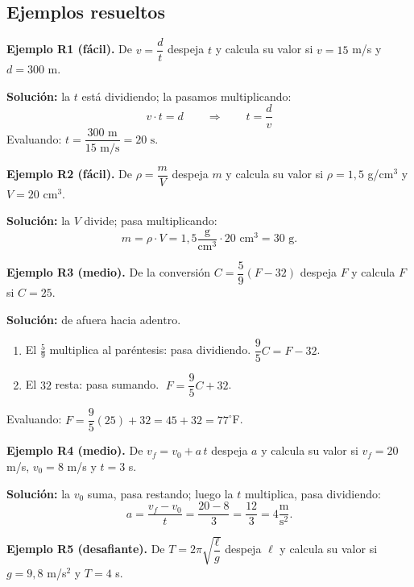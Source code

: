 \documentclass[12pt, letterpaper]{article}
\begin{document}
\subsection{Ejemplos resueltos}

\textbf{Ejemplo R1 (fácil).} De $v = \dfrac{d}{t}$ despeja $t$ y calcula su valor si $v = 15$ m/s y $d = 300$ m.

\begin{cuadrosolucion}
  \textbf{Solución:} la $t$ está dividiendo; la pasamos multiplicando:
  $$v \cdot t = d \qquad \Longrightarrow \qquad t = \frac{d}{v}$$
  Evaluando: $t = \dfrac{300 \text{ m}}{15 \text{ m/s}} = 20 \text{ s}$.
\end{cuadrosolucion}

\textbf{Ejemplo R2 (fácil).} De $\rho = \dfrac{m}{V}$ despeja $m$ y calcula su valor si $\rho = 1{,}5$ g/cm$^3$ y $V = 20$ cm$^3$.

\begin{cuadrosolucion}
  \textbf{Solución:} la $V$ divide; pasa multiplicando:
  $$m = \rho \cdot V = 1{,}5 \frac{\text{g}}{\text{cm}^3} \cdot 20 \text{ cm}^3 = 30 \text{ g}.$$
\end{cuadrosolucion}

\textbf{Ejemplo R3 (medio).} De la conversión $C = \dfrac{5}{9}(F - 32)$ despeja $F$ y calcula $F$ si $C = 25$.

\begin{cuadrosolucion}
  \textbf{Solución:} de afuera hacia adentro.
  \begin{enumerate}[leftmargin=*, label=\arabic*.]
    \item El $\frac{5}{9}$ multiplica al paréntesis: pasa dividiendo. $\dfrac{9}{5}C = F - 32$.
    \item El $32$ resta: pasa sumando. $\;F = \dfrac{9}{5}C + 32$.
  \end{enumerate}
  Evaluando: $F = \dfrac{9}{5}(25) + 32 = 45 + 32 = 77^{\circ}$F.
\end{cuadrosolucion}

\textbf{Ejemplo R4 (medio).} De $v_f = v_0 + a\,t$ despeja $a$ y calcula su valor si $v_f = 20$ m/s, $v_0 = 8$ m/s y $t = 3$ s.

\begin{cuadrosolucion}
  \textbf{Solución:} la $v_0$ suma, pasa restando; luego la $t$ multiplica, pasa dividiendo:
  $$a = \frac{v_f - v_0}{t} = \frac{20 - 8}{3} = \frac{12}{3} = 4 \frac{\text{m}}{\text{s}^2}.$$
\end{cuadrosolucion}

\textbf{Ejemplo R5 (desafiante).} De $T = 2\pi\sqrt{\dfrac{\ell}{g}}$ despeja $\ell$ y calcula su valor si $g = 9{,}8$ m/s$^2$ y $T = 4$ s.
\end{document}

